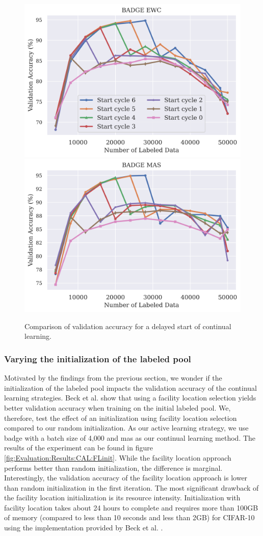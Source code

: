 \begin{figure}[h]
    \centering
    \includegraphics[width=0.45\linewidth]{images/results_CAL/delayed_start_badge_ewc.png} \hfill
    \includegraphics[width=0.45\linewidth]{images/results_CAL/delayed_start_badge_mas.png}
    \caption{Comparison of validation accuracy for a delayed start of continual learning.}
    \label{fig:Evaluation:CAL:DelayedStart}
\end{figure}

\subsubsection{Varying the initialization of the labeled pool}
\label{sec:Evaluation:CAL:Initialization}
Motivated by the findings from the previous section, we wonder if the initialization of the labeled pool impacts the validation accuracy of the continual learning strategies.
Beck et al. \cite{beck2021effective} show that using a facility location selection \cite{iyer2021submodular} yields better validation accuracy when training on the initial labeled pool.
We, therefore, test the effect of an initialization using facility location selection compared to our random initialization. As our active learning strategy, we use \gls{badge} with
a batch size of 4,000 and \gls{mas} as our continual learning method. The results of the experiment can be found in figure \ref{fig:Evaluation:Results:CAL:FLinit}. While the facility
location approach performs better than random initialization, the difference is marginal. Interestingly, the validation accuracy of the facility location approach is lower than
random initialization in the first iteration. The most significant drawback of the facility location initialization is its resource intensity. Initialization with facility
location takes about 24 hours to complete and requires more than 100GB of memory (compared to less than 10 seconds and less than 2GB) for CIFAR-10 using the implementation provided by Beck et al.
\cite{beck2021effective}. \par

